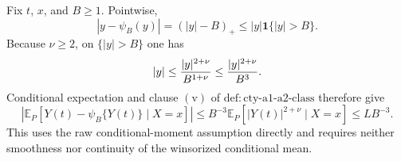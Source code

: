 Fix \(t\), \(x\), and \(B\geq1\).  Pointwise,
\[
 |y-\psi_B(y)|=(|y|-B)_+\leq |y|\mathbf 1\{|y|>B\}.
\]
Because \(\nu\geq2\), on \(\{|y|>B\}\) one has
\[
 |y|\leq {|y|^{2+\nu}\over B^{1+\nu}}
 \leq {|y|^{2+\nu}\over B^3}.
\]
Conditional expectation and clause \(\mathrm{(v)}\) of \(\mathrm{def:cty\text{-}a1\text{-}a2\text{-}class}\) therefore give
\[
 \left|\mathbb E_P\!\left[Y(t)-\psi_B\{Y(t)\}\mid X=x\right]\right|
 \leq B^{-3}\mathbb E_P[|Y(t)|^{2+\nu}\mid X=x]
 \leq LB^{-3}.
\]
This uses the raw conditional-moment assumption directly and requires neither smoothness nor continuity of the winsorized conditional mean.